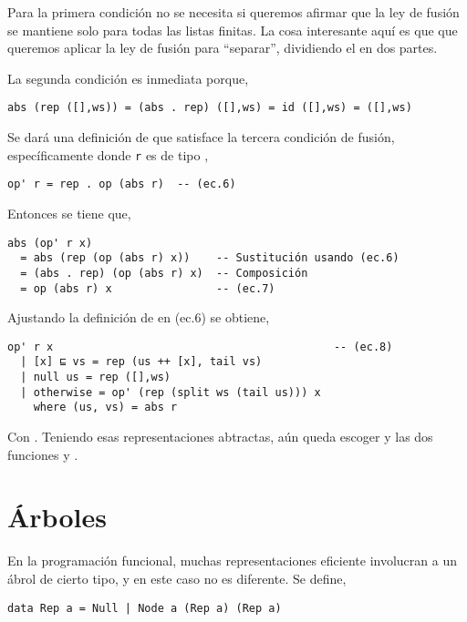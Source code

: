 Para la primera condición no se necesita si queremos afirmar que la ley de fusión se mantiene solo para todas las listas finitas.
La cosa interesante aquí es que que queremos aplicar la ley de fusión para ``separar'', dividiendo el  en dos partes.

La segunda condición es inmediata porque,
\begin{verbatim}
abs (rep ([],ws)) = (abs . rep) ([],ws) = id ([],ws) = ([],ws)
\end{verbatim}

Se dará una definición de  que satisface la tercera condición de fusión,
específicamente donde \texttt{r} es de tipo ,
\begin{verbatim}
op' r = rep . op (abs r)  -- (ec.6)
\end{verbatim}

Entonces se tiene que,
\begin{verbatim}
abs (op' r x) 
  = abs (rep (op (abs r) x))    -- Sustitución usando (ec.6)
  = (abs . rep) (op (abs r) x)  -- Composición
  = op (abs r) x                -- (ec.7)
\end{verbatim}

Ajustando la definición de  en (ec.6) se obtiene,
\begin{verbatim}
op' r x                                           -- (ec.8)
  | [x] ⊑ vs = rep (us ++ [x], tail vs)
  | null us = rep ([],ws)
  | otherwise = op' (rep (split ws (tail us))) x
    where (us, vs) = abs r  
\end{verbatim}

Con . Teniendo esas representaciones
abtractas, aún queda escoger  y las dos funciones  y .

\section{Árboles}
En la programación funcional, muchas representaciones eficiente involucran a un ábrol de cierto
tipo, y en este caso no es diferente. Se define,
\begin{verbatim}
data Rep a = Null | Node a (Rep a) (Rep a)
\end{verbatim}

